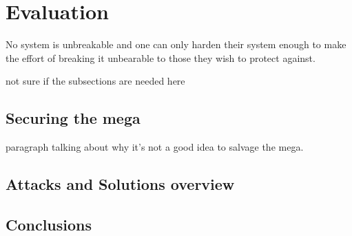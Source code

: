 \section{Evaluation}
\label{sec:conclusion}

No system is unbreakable and one can only harden their system enough to make the effort of breaking it unbearable to those they wish to protect against\citep{anderson:cautionary_note}\cite{sergei:thesis}.

	not sure if the subsections are needed here
	\subsection{Securing the mega}
		paragraph talking about why it's not a good idea to salvage the mega.
	\subsection{Attacks and Solutions overview}
	\subsection{Conclusions}